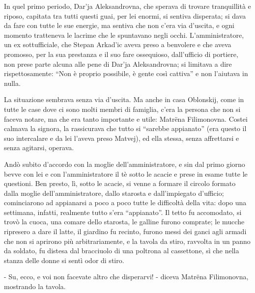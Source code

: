 In quel primo periodo, Dar'ja Aleksandrovna, che sperava di trovare tranquillità e riposo, capitata tra tutti questi guai, per lei enormi, si sentiva disperata; si dava da fare con tutte le sue energie, ma sentiva che non c'era via d'uscita, e ogni momento tratteneva le lacrime che le spuntavano negli occhi. L'amministratore, un ex sottufficiale, che Stepan Arkad'ic aveva preso a benvolere e che aveva promosso, per la sua prestanza e il suo fare ossequioso, dall'ufficio di portiere, non prese parte alcuna alle pene di Dar'ja Aleksandrovna; si limitava a dire rispettosamente: ``Non è proprio possibile, è gente così cattiva'' e non l'aiutava in nulla. 

La situazione sembrava senza via d'uscita. Ma anche in casa Oblonskij, come in tutte le case dove ci sono molti membri di famiglia, c'era la persona che non si faceva notare, ma che era tanto importante e utile: Matrëna Filimonovna. Costei calmava la signora, la rassicurava che tutto si ``sarebbe appianato'' (era questo il suo intercalare e da lei l'aveva preso Matvej), ed ella stessa, senza affrettarsi e senza agitarsi, operava. 

Andò subito d'accordo con la moglie dell'amministratore, e sin dal primo giorno bevve con lei e con l'amministratore il tè sotto le acacie e prese in esame tutte le questioni. Ben presto, lì, sotto le acacie, si venne a formare il circolo formato dalla moglie dell'amministratore, dallo starosta e dall'impiegato d'ufficio; cominciarono ad appianarsi a poco a poco tutte le difficoltà della vita: dopo una settimana, infatti, realmente tutto s'era ``appianato''. Il tetto fu accomodato, si trovò la cuoca, una comare dello starosta, le galline furono comprate; le mucche ripresero a dare il latte, il giardino fu recinto, furono messi dei ganci agli armadi che non si aprirono più arbitrariamente, e la tavola da stiro, ravvolta in un panno da soldato, fu distesa dal bracciuolo di una poltrona al cassettone, sì che nella stanza delle donne si sentì odor di stiro. 

- Su, ecco, e voi non facevate altro che disperarvi! - diceva Matrëna Filimonovna, mostrando la tavola. 

